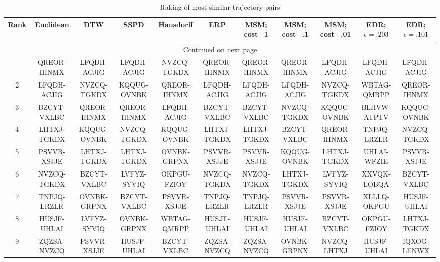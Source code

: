 \begin{landscape}
{
\scriptsize
\tabcolsep=2.5pt  %
\renewcommand{\arraystretch}{1.1}

\begin{longtable}{ccccccccccc}

\caption{Raking of most similar trajectory pairs}                                
\label{app:tab:top50}\\
\toprule
  \textbf{Rank} & 
  \textbf{Euclidean} &
  \textbf{DTW} &
  \textbf{SSPD} &
  \textbf{Hausdorff} &
  \textbf{ERP} &
  \textbf{MSM; cost=1} &
  \textbf{MSM; cost=.1} &
  \textbf{MSM; cost=.01} &
  \textbf{EDR; $\epsilon=.203$} &
  \textbf{EDR; $\epsilon=.101$} \\
\hline          
\endhead
\multicolumn{11}{c}{{}} \\
\midrule
\multicolumn{11}{c}{{Continued on next page}} \\
\midrule
\endfoot
\endlastfoot
1  &  QREOR-IHNMX &  LFQDH-ACJIG &  LFQDH-ACJIG &  NVZCQ-TGKDX &  QREOR-IHNMX &  QREOR-IHNMX &  QREOR-IHNMX &  LFQDH-ACJIG &  LFQDH-ACJIG &  LFQDH-ACJIG \\
2  &  LFQDH-ACJIG &  NVZCQ-TGKDX &  KQQUG-OVNBK &  QREOR-IHNMX &  LFQDH-ACJIG &  LFQDH-ACJIG &  LFQDH-ACJIG &  NVZCQ-TGKDX &  WBTAG-QMRPP &  QREOR-IHNMX \\
3  &  BZCYT-VXLBC &  QREOR-IHNMX &  QREOR-IHNMX &  LFQDH-ACJIG &  BZCYT-VXLBC &  BZCYT-VXLBC &  NVZCQ-TGKDX &  KQQUG-OVNBK &  BLHVW-ATPTV &  KQQUG-OVNBK \\
4  &  LHTXJ-TGKDX &  KQQUG-OVNBK &  NVZCQ-TGKDX &  KQQUG-OVNBK &  LHTXJ-TGKDX &  LHTXJ-TGKDX &  BZCYT-VXLBC &  QREOR-IHNMX &  TNPJQ-LRZLR &  NVZCQ-TGKDX \\
5  &  PSVVR-XSJJE &  LHTXJ-TGKDX &  LHTXJ-TGKDX &  OVNBK-GRPNX &  PSVVR-XSJJE &  PSVVR-XSJJE &  KQQUG-OVNBK &  LHTXJ-TGKDX &  UHLAI-WFZIE &  PSVVR-XSJJE \\
6  &  NVZCQ-TGKDX &  BZCYT-VXLBC &  LVFYZ-SYVIQ &  OKPGU-FZIOY &  NVZCQ-TGKDX &  NVZCQ-TGKDX &  LHTXJ-TGKDX &  LVFYZ-SYVIQ &  XXVQK-LOBQA &  BZCYT-VXLBC \\
7  &  TNPJQ-LRZLR &  OVNBK-GRPNX &  BZCYT-VXLBC &  PSVVR-XSJJE &  TNPJQ-LRZLR &  TNPJQ-LRZLR &  PSVVR-XSJJE &  PSVVR-XSJJE &  XLLLQ-OKPGU &  HUSJF-UHLAI \\
8  &  HUSJF-UHLAI &  LVFYZ-SYVIQ &  OVNBK-GRPNX &  WBTAG-QMRPP &  HUSJF-UHLAI &  HUSJF-UHLAI &  HUSJF-UHLAI &  BZCYT-VXLBC &  OKPGU-FZIOY &  LHTXJ-TGKDX \\
9  &  ZQZSA-NVZCQ &  PSVVR-XSJJE &  HUSJF-UHLAI &  BZCYT-VXLBC &  ZQZSA-NVZCQ &  ZQZSA-NVZCQ &  OVNBK-GRPNX &  NVZCQ-LHTXJ &  HUSJF-UHLAI &  IQXOG-LENWX \\

\end{longtable}}
\end{landscape}
